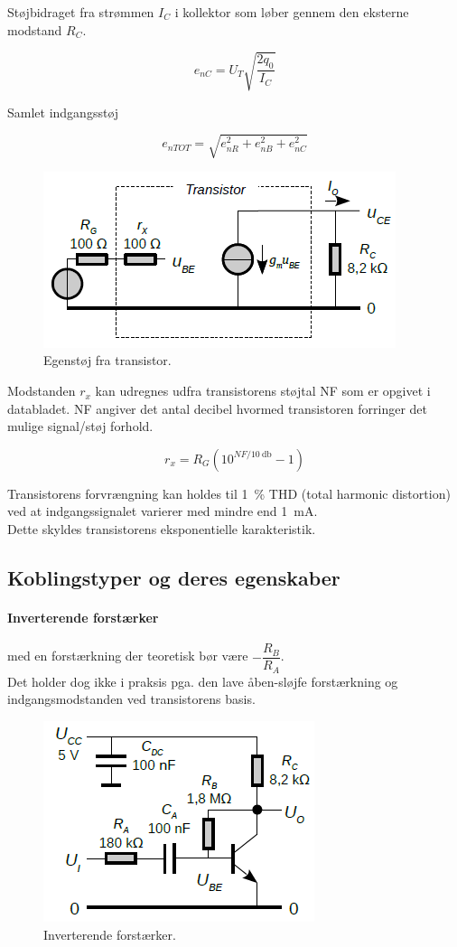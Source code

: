 \documentclass[danish]{article}
\begin{document}
Støjbidraget fra strømmen $I_C$ i kollektor som løber gennem den eksterne modstand $R_C$.

\begin{equation} 
e_{nC} = U_T \sqrt{\dfrac{2q_0}{I_C}}
\end{equation}

Samlet indgangsstøj

\begin{equation} 
e_{nTOT} = \sqrt{e_{nR}^2+e_{nB}^2+e_{nC}^2}
\end{equation}

\begin{figure} [H]
	\centering
	\includegraphics[width=0.5\linewidth]{graphics/stoj}
	\caption{Egenstøj fra transistor.}
	\label{fig:stoj}
\end{figure}

Modstanden $r_x$ kan udregnes udfra transistorens støjtal NF som er opgivet i databladet. NF angiver det antal decibel hvormed transistoren forringer det mulige signal/støj forhold.

\begin{equation} 
r_x = R_G (10^{NF/\SI{10}{\decibel}}-1)
\end{equation}

Transistorens forvrængning kan holdes til \SI{1}{\percent} THD (total harmonic distortion) ved at indgangssignalet varierer med mindre end \SI{1}{\milli\ampere}. \\

Dette skyldes transistorens eksponentielle karakteristik.

\newpage
\subsection{Koblingstyper og deres egenskaber}
\paragraph{Inverterende forstærker} med en forstærkning der teoretisk bør være $-\dfrac{R_B}{R_A}$.\\

Det holder dog ikke i praksis pga. den lave åben-sløjfe forstærkning og indgangsmodstanden ved transistorens basis.

\begin{figure} [H]
	\centering
	\includegraphics[width=0.4\linewidth]{graphics/inverterende_for}
	\caption{Inverterende forstærker.}
	\label{fig:inverterende_for}
\end{figure}
		
\end{document}
